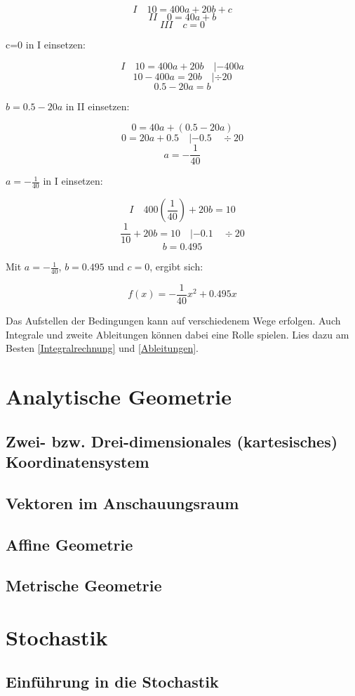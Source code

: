 \documentclass{article}
\begin{document}
			\[ I \quad 10=400a+20b+c \]
			\[ II \quad 0=40a+b \]
			\[ III \quad c=0 \]
			
			c=0 in I einsetzen:
			
			\[I \quad 10=400a+20b \quad |-400a \]
			\[ 10-400a=20b \quad | \div 20\]
			\[ 0.5-20a=b\]
			
			$b= 0.5-20a $ in II einsetzen:
			
			\[ 0=40a+(0.5-20a)\]
			\[ 0=20a+0.5 \quad |-0.5 \quad \div 20\]
			\[ a=-\frac{1}{40} \]
			
			$a=-\frac{1}{40}$ in I einsetzen:
			
			\[ I \quad 400(\frac{1}{40})+20b=10 \]
			\[ \frac{1}{10}+20b=10 \quad |-0.1 \quad \div 20\]
			\[ b=0.495\]
			
			Mit $a=-\frac{1}{40}$, $b=0.495$ und $c=0$, ergibt sich:
			
			\[f(x)=-\frac{1}{40}x^2+0.495x\]
			
			Das Aufstellen der Bedingungen kann auf verschiedenem Wege erfolgen. Auch Integrale und zweite Ableitungen können dabei eine Rolle spielen.
			Lies dazu am Besten \ref{Integralrechnung} und \ref{Ableitungen}.
		
\section{Analytische Geometrie}
\subsection{Zwei- bzw. Drei-dimensionales (kartesisches) Koordinatensystem}
\subsection{Vektoren im Anschauungsraum}
\subsection{Affine Geometrie}
\subsection{Metrische Geometrie}

\section{Stochastik}
\subsection{Einführung in die Stochastik}
\end{document}
